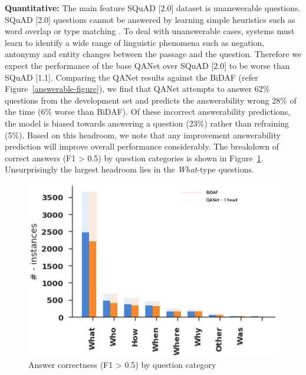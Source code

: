 \documentclass{article}
\begin{document}
\textbf{Quantitative:} The main feature SQuAD [2.0] dataset is unanswerable questions. SQuAD [2.0] questions cannot be answered by learning simple heuristics such as word overlap or type matching \cite{rajpurkar2016squad}. To deal with unanswerable cases, systems must learn to identify a wide range of linguistic phenomena such as negation, antonymy and entity changes between the passage and the question. Therefore we expect the performance of the base QANet over SQuAD [2.0] to be worse than SQuAD [1.1]. Comparing the QANet results against the BiDAF (refer Figure~\ref{answerable-figure}), we find that QANet attempts to answer 62\% questions from the development set and predicts the answerability wrong 28\% of the time (6\% worse than BiDAF). Of these incorrect answerability predictions, the model is biased towards answering a question (23\%) rather than refraining (5\%). Based on this headroom, we note that any improvement answerability prediction will improve overall performance considerably.
The breakdown of correct answers (F1 > 0.5) by question categories is shown in Figure~\ref{f1_gt_0.5_question_catagories-figure}. Unsurprisingly the largest headroom lies in the \textit{What}-type questions.

\begin{figure}
  \vspace{-15pt}
\centering
   \includegraphics[width=\linewidth]{../images/f1gt5question_catagories.png}
\caption{Answer correctness (F1 > 0.5) by question category}
\label{f1_gt_0.5_question_catagories-figure}
\end{figure}
\end{document}
